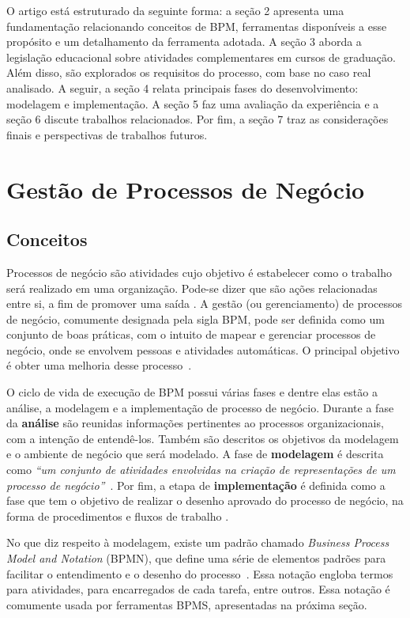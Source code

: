 \documentclass[12pt]{article}
\begin{document}
O artigo está estruturado da seguinte forma: a seção 2 apresenta uma fundamentação relacionando conceitos de BPM, ferramentas disponíveis a esse propósito e um detalhamento da ferramenta adotada. A seção 3 aborda a legislação educacional sobre atividades complementares em cursos de graduação. Além disso, são explorados os requisitos do processo, com base no caso real analisado. A seguir, a seção 4 relata principais fases do desenvolvimento: modelagem e implementação. A seção 5 faz uma avaliação da experiência e a seção 6 discute trabalhos relacionados. Por fim, a seção 7 traz as considerações finais e perspectivas de trabalhos futuros.


\section{Gestão de Processos de Negócio}

\subsection{Conceitos}

Processos de negócio são atividades cujo objetivo é estabelecer como o trabalho será realizado em uma organização. Pode-se dizer que são ações relacionadas entre si, a fim de promover uma saída \cite{ABPMP}. A gestão (ou gerenciamento) de processos de negócio, comumente designada pela sigla BPM, pode ser definida como um conjunto de boas práticas, com o intuito de mapear e gerenciar processos de negócio, onde se envolvem pessoas e atividades automáticas. O principal objetivo é obter uma melhoria desse processo~\cite{weske}.

O ciclo de vida de execução de BPM possui várias fases e dentre elas estão a análise, a modelagem e a implementação de processo de negócio. Durante a fase da \textbf{análise} são reunidas informações pertinentes ao processos organizacionais, com a intenção de entendê-los. Também são descritos os objetivos da modelagem e o ambiente de negócio que será modelado. A fase de \textbf{modelagem} é descrita como \emph{“um conjunto de atividades envolvidas na criação de representações de um processo de negócio”}~\cite{ABPMP}. Por fim, a etapa de \textbf{implementação} é definida como a fase que tem o objetivo de realizar o desenho aprovado do processo de negócio, na forma de procedimentos e fluxos de trabalho \cite{ABPMP}.

	No que diz respeito à modelagem, existe um padrão chamado \emph{Business Process Model and Notation} (BPMN), que define  uma série de elementos padrões para facilitar o entendimento e o desenho do processo~\cite{BPMN}. Essa notação engloba termos para atividades, para encarregados de cada tarefa, entre outros. Essa notação é comumente usada por ferramentas BPMS, apresentadas na próxima seção.
\end{document}
